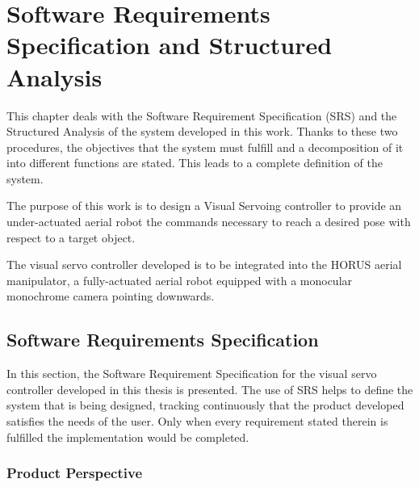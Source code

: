 
\chapter{Software Requirements Specification and Structured Analysis}
\label{chap:srs-sa}

This chapter deals with the Software Requirement Specification (SRS) \cite{IEEE8301998} and the Structured Analysis \cite{SA_Braune} of the system developed in this work. Thanks to these two procedures, the objectives that the system must fulfill and a decomposition of it into different functions are stated. This leads to a complete definition of the system.


The purpose of this work is to design a Visual Servoing controller to provide an under-actuated aerial robot the commands necessary to reach a desired pose with respect to a target object.



The visual servo controller developed is to be integrated into the HORUS aerial manipulator, a fully-actuated aerial robot equipped with a monocular monochrome camera pointing downwards.



\section{Software Requirements Specification}
\label{sec:srs}

In this section, the Software Requirement Specification \cite{IEEE8301998} for the visual servo controller developed in this thesis is presented. The use of SRS helps to define the system that is being designed, tracking continuously that the product developed satisfies the needs of the user. Only when every requirement stated therein is fulfilled the implementation would be completed.

\subsection{Product Perspective}
\label{sec:product-perspective}


